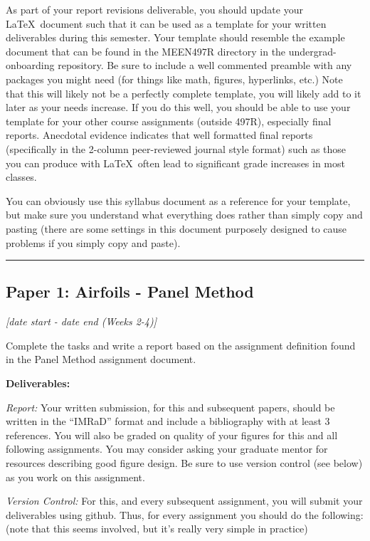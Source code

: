 \documentclass[12pt]{article}
\begin{document}
As part of your report revisions deliverable, you should update your \LaTeX~document such that it can be used as a template for your written deliverables during this semester.
Your template should resemble the example document that can be found in the MEEN497R directory in the undergrad-onboarding repository.
Be sure to include a well commented preamble with any packages you might need (for things like math, figures, hyperlinks, etc.)
Note that this will likely not be a perfectly complete template, you will likely add to it later as your needs increase.  If you do this well, you should be able to use your template for your other course assignments (outside 497R), especially final reports.  Anecdotal evidence indicates that well formatted final reports (specifically in the 2-column peer-reviewed journal style format) such as those you can produce with \LaTeX~often lead to significant grade increases in most classes.

You can obviously use this syllabus document as a reference for your template, but make sure you understand what everything does rather than simply copy and pasting (there are some settings in this document purposely designed to cause problems if you simply copy and paste).



\vspace{1em}\hrule\vspace{1em}
\subsection{Paper 1: Airfoils - Panel Method }
\label{ssec:p1}
\textit{[date start - date end (Weeks 2-4)]}

\bigskip

Complete the tasks and write a report based on the assignment definition found in the Panel Method assignment document.

\bigskip

\noindent \textbf{Deliverables:}

\textit{Report:} Your written submission, for this and subsequent papers, should be written in the ``IMRaD'' format and include a bibliography with at least 3 references. 
You will also be graded on quality of your figures for this and all following assignments.
You may consider asking your graduate mentor for resources describing good figure design.
Be sure to use version control (see below) as you work on this assignment.

\textit{Version Control:}
For this, and every subsequent assignment, you will submit your deliverables using github.  Thus, for every assignment you should do the following: (note that this seems involved, but it's really very simple in practice)
\end{document}

